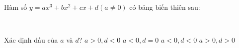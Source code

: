 \begin{ex}%
Hàm số $y=ax^3+bx^2+cx+d(a \neq 0)$ có bảng biến thiên sau:\\
\begin{center}


\\
\end{center}
Xác định dấu của $a$ và $d$?
\choice
{$a>0,d<0$}
{$a<0,d=0$}
{$a<0,d<0$}
{\True $a>0,d>0$}

\end{ex}

